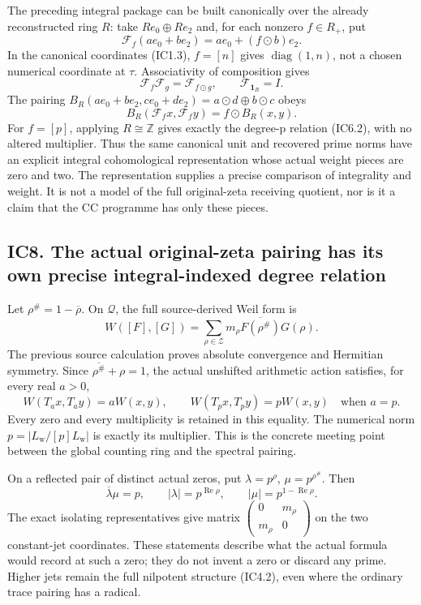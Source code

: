 \documentclass[
]{article}
\begin{document}
The preceding integral package can be built canonically over the already
reconstructed ring \(R\): take \(R e_0\oplus R e_2\) and, for each
nonzero \(f\in R_+\), put \[
\mathcal F_f(ae_0+be_2)=ae_0+(f\odot b)e_2.
\tag{IC7.1}
\] In the canonical coordinates (IC1.3), \(f=[n]\) gives
\(\operatorname{diag}(1,n)\), not a chosen numerical coordinate at
\(\tau\). Associativity of composition gives \[
\mathcal F_f\mathcal F_g=\mathcal F_{f\odot g},\qquad
\mathcal F_{\mathbf1_R}=I.
\tag{IC7.2}
\] The pairing \(B_R(ae_0+be_2,ce_0+de_2)=a\odot d\oplus b\odot c\)
obeys \[
B_R(\mathcal F_fx,\mathcal F_fy)=f\odot B_R(x,y).
\tag{IC7.3}
\] For \(f=[p]\), applying \(R\cong\mathbb Z\) gives exactly the
degree-p relation (IC6.2), with no altered multiplier. Thus the same
canonical unit and recovered prime norms have an explicit integral
cohomological representation whose actual weight pieces are zero and
two. The representation supplies a precise comparison of integrality and
weight. It is not a model of the full original-zeta receiving quotient,
nor is it a claim that the CC programme has only these pieces.

\subsection{IC8. The actual original-zeta pairing has its own precise
integral-indexed degree
relation}\label{ic8.-the-actual-original-zeta-pairing-has-its-own-precise-integral-indexed-degree-relation}

Let \(\rho^\#=1-\overline\rho\). On \(\mathcal Q\), the full
source-derived Weil form is \[
W([F],[G])=\sum_{\rho\in\mathscr Z}m_\rho
\overline{F(\rho^\#)}G(\rho).
\tag{IC8.1}
\] The previous source calculation proves absolute convergence and
Hermitian symmetry. Since \(\overline{\rho^\#}+\rho=1\), the actual
unshifted arithmetic action satisfies, for every real \(a>0\), \[
W(T_ax,T_ay)=aW(x,y),\qquad
W(T_px,T_py)=pW(x,y)\quad\text{when }a=p.
\tag{IC8.2}
\] Every zero and every multiplicity is retained in this equality. The
numerical norm \(p=|L_{\mathrm w}/[p]L_{\mathrm w}|\) is exactly its
multiplier. This is the concrete meeting point between the global
counting ring and the spectral pairing.

On a reflected pair of distinct actual zeros, put \(\lambda=p^\rho\),
\(\mu=p^{\rho^\#}\). Then \[
\overline\lambda\mu=p,
\qquad |\lambda|=p^{\operatorname{Re}\rho},
\qquad |\mu|=p^{1-\operatorname{Re}\rho}.
\tag{IC8.3}
\] The exact isolating representatives give matrix
\(\left(\begin{smallmatrix}0&m_\rho\\m_\rho&0\end{smallmatrix}\right)\)
on the two constant-jet coordinates. These statements describe what the
actual formula would record at such a zero; they do not invent a zero or
discard any prime. Higher jets remain the full nilpotent structure
(IC4.2), even where the ordinary trace pairing has a radical.
\end{document}
